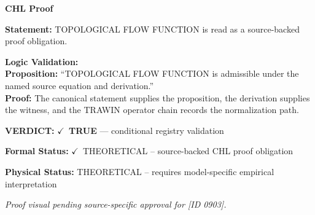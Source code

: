 \vspace{0.45em}
\noindent\textbf{CHL Proof}\par
\textbf{Statement:} TOPOLOGICAL FLOW FUNCTION is read as a source-backed proof obligation.

\textbf{Logic Validation:}\\
\textbf{Proposition:} ``TOPOLOGICAL FLOW FUNCTION is admissible under the named source equation and derivation.''\\
\textbf{Proof:} The canonical statement supplies the proposition, the derivation supplies the witness, and the TRAWIN operator chain records the normalization path.

\textbf{VERDICT:} \ensuremath{\checkmark}\ \textbf{TRUE} --- conditional registry validation

\textbf{Formal Status:} \ensuremath{\checkmark}\ THEORETICAL -- source-backed CHL proof obligation

\textbf{Physical Status:} THEORETICAL -- requires model-specific empirical interpretation
\par\vspace{0.45em}
\par
\vfill
\begingroup\footnotesize\itshape
Proof visual pending source-specific approval for [ID 0903].
\par\endgroup
\vfill
\endgroup
\endgroup
